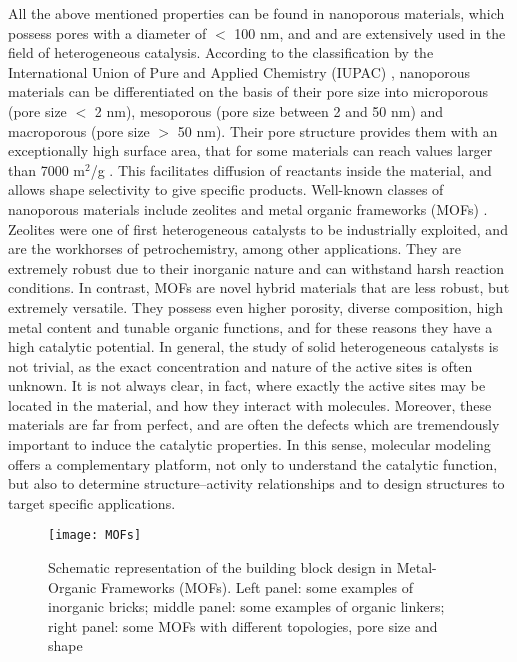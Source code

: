 \npar
All the above mentioned properties can be found in nanoporous materials, which possess pores with a diameter of $<$ 100 nm, and and are extensively used in the field of heterogeneous catalysis. According to the classification by the International Union of Pure and Applied Chemistry (IUPAC) \cite{mcnaught1997compendium}, nanoporous materials can be differentiated on the basis of their pore size into microporous (pore size $<$ 2 nm), mesoporous (pore size between 2 and 50 nm) and macroporous (pore size $>$ 50 nm). Their pore structure provides them with an exceptionally high surface area, that for some materials can reach values larger than 7000 m$^2$/g \cite{farha2012metal, honicke2018balancing}. This facilitates diffusion of reactants inside the material, and allows shape selectivity to give specific products. Well-known classes of nanoporous materials include zeolites and metal organic frameworks (MOFs) \cite{liang2017heterogeneous}. Zeolites were one of first heterogeneous catalysts to be industrially exploited, and are the workhorses of petrochemistry, among other applications. They are extremely robust due to their inorganic nature and can withstand harsh reaction conditions. In contrast, MOFs are novel hybrid materials that are less robust, but extremely versatile. They possess even higher porosity, diverse composition, high metal content and tunable organic functions, and for these reasons they have a high catalytic potential. 
\npar
In general, the study of solid heterogeneous catalysts is not trivial, as the exact concentration and nature of the active sites is often unknown. It is not always clear, in fact, where exactly the active sites may be located in the material, and how they interact with molecules. Moreover, these materials are far from perfect, and are often the defects which are tremendously important to induce the catalytic properties. In this sense, molecular modeling offers a complementary platform, not only to understand the catalytic function, but also to determine structure--activity relationships and to design structures to target specific applications\cite{van2015advances}. 

\begin{figure}[!htbp]
	\centering
 	\texttt{[image: MOFs]}
	\caption{Schematic representation of the building block design in Metal-Organic Frameworks (MOFs). Left panel: some examples of inorganic bricks; middle panel: some examples of organic linkers; right panel: some MOFs with different topologies, pore size and shape}
	\label{fig:MOFs}
\end{figure}

